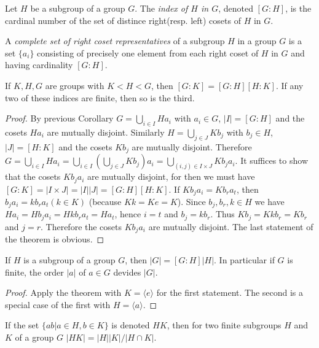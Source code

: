\begin{Definition}
	Let $ H $ be a subgroup of a group $ G $. The \textit{index of $ H $ in $ G $}, denoted $ [G:H] $, is the cardinal number of the set of distince right(resp. left) cosets of $ H $ in $ G $.
\end{Definition}
\begin{Definition}
	A \textit{complete set of right coset representatives} of a subgroup $ H $ in a group $ G $ is a set $ \{a_i\} $ consisting of precisely one element from each right coset of $ H $ in $ G $ and having cardinality $ [G:H] $.
\end{Definition}
\begin{Theorem}
	If $ K,H,G $ are groups with $ K<H<G $, then $ [G:K]=[G:H][H:K] $. If any two of these indices are finite, then so is the third.
\end{Theorem}
\begin{proof}
	By previous Corollary $ G = \bigcup_{i \in I}H a_i $ with $ a_i \in G $, $ |I| = [G:H] $ and the cosets $ Ha_i $ are mutually disjoint. Similarly $ H = \bigcup_{j \in J}Kb_j $ with $ b_j \in H $, $ |J| = [H:K] $ and the cosets $ Kb_j $ are mutually disjoint. Therefore $ G = \bigcup_{i \in I}Ha_i = \bigcup_{i \in I}(\bigcup_{j \in J}Kb_j)a_i =\bigcup_{(i,j)\in I \times J}Kb_j a_i$. It suffices to show that the cosets $ Kb_ja_i $ are mutually disjoint, for then we must have $ [G:K]=|I\times J| = |I||J| = [G:H][H:K] $. If $ Kb_ja_i=Kb_ra_t $, then $ b_j a_i = kb_r a_t(k \in K) $ (because $ Kk = Ke=K $). Since $ b_j,b_r,k \in H $ we have $ H a_i = H b_ja_i = H k b_r a_t = H a_t $, hence $ i=t $ and $ b_j = kb_r $. Thus $ K b_j = Kkb_r=Kb_r $ and $ j = r $. Therefore the cosets $ Kb_ja_i $ are mutually disjoint. The last statement of the theorem is obvious.
\end{proof}
\begin{Corollary}[Lagrange]
	If $ H $ is a subgroup of a group $ G $, then $ |G| = [G:H]|H| $. In particular if $ G $ is finite, the order $ |a| $ of $ a \in G $ devides $ |G| $.
\end{Corollary}
\begin{proof}
	Apply the theorem with $ K = \langle e\rangle $ for the first statement. The second is a special case of the first with $ H = \langle a\rangle $.
\end{proof}
\begin{Theorem}
	If the set $ \{ab|a\in H,b \in K \} $ is denoted $ HK $, then for two finite subgroups $ H $ and $ K $ of a group $ G $ $ |HK|=|H||K|/|H \cap K| $.
\end{Theorem}

